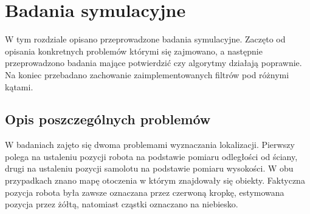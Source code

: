 \chapter{Badania symulacyjne} \label{przeg}
W tym rozdziale opisano przeprowadzone badania symulacyjne. Zaczęto od opisania konkretnych problemów którymi się zajmowano, a następnie przeprowadzono badania mające potwierdzić czy algorytmy działają poprawnie. Na koniec przebadano zachowanie zaimplementowanych filtrów pod różnymi kątami.
\section{Opis poszczególnych problemów}
W badaniach zajęto się dwoma problemami wyznaczania lokalizacji. Pierwszy polega na ustaleniu pozycji robota na podstawie pomiaru odległości od ściany, drugi na ustaleniu pozycji samolotu na podstawie pomiaru wysokości. W obu przypadkach znano mapę otoczenia w którym znajdowały się obiekty. Faktyczna pozycja robota była zawsze oznaczana przez czerwoną kropkę, estymowana pozycja przez żółtą, natomiast cząstki oznaczano na niebiesko.
